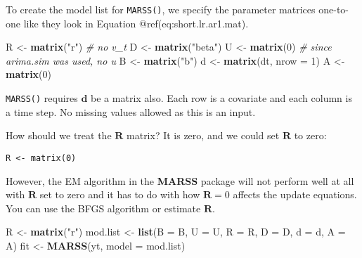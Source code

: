 \documentclass[12pt,]{book}
\newenvironment{Shaded}{\begin{snugshade}}{\end{snugshade}}
\newcommand{\CommentTok}[1]{\textcolor[rgb]{0.56,0.35,0.01}{\textit{#1}}}
\newcommand{\DataTypeTok}[1]{\textcolor[rgb]{0.13,0.29,0.53}{#1}}
\newcommand{\DecValTok}[1]{\textcolor[rgb]{0.00,0.00,0.81}{#1}}
\newcommand{\KeywordTok}[1]{\textcolor[rgb]{0.13,0.29,0.53}{\textbf{#1}}}
\newcommand{\NormalTok}[1]{#1}
\newcommand{\StringTok}[1]{\textcolor[rgb]{0.31,0.60,0.02}{#1}}
\begin{document}
To create the model list for \texttt{MARSS()}, we specify the parameter matrices one-to-one like they look in Equation @ref(eq:short.lr.ar1.mat).

\begin{Shaded}
\begin{Highlighting}[]
\NormalTok{R <-}\StringTok{ }\KeywordTok{matrix}\NormalTok{(}\StringTok{"r"}\NormalTok{)  }\CommentTok{# no v_t}
\NormalTok{D <-}\StringTok{ }\KeywordTok{matrix}\NormalTok{(}\StringTok{"beta"}\NormalTok{)}
\NormalTok{U <-}\StringTok{ }\KeywordTok{matrix}\NormalTok{(}\DecValTok{0}\NormalTok{)  }\CommentTok{# since arima.sim was used, no u}
\NormalTok{B <-}\StringTok{ }\KeywordTok{matrix}\NormalTok{(}\StringTok{"b"}\NormalTok{)}
\NormalTok{d <-}\StringTok{ }\KeywordTok{matrix}\NormalTok{(dt, }\DataTypeTok{nrow =} \DecValTok{1}\NormalTok{)}
\NormalTok{A <-}\StringTok{ }\KeywordTok{matrix}\NormalTok{(}\DecValTok{0}\NormalTok{)}
\end{Highlighting}
\end{Shaded}

\texttt{MARSS()} requires \(\mathbf{d}\) be a matrix also. Each row is a covariate and each column is a time step. No missing values allowed as this is an input.

How should we treat the \(\mathbf{R}\) matrix? It is zero, and we could set \(\mathbf{R}\) to zero:

\begin{verbatim}
R <- matrix(0)
\end{verbatim}

However, the EM algorithm in the \textbf{MARSS} package will not perform well at all with \(\mathbf{R}\) set to zero and it has to do with how \(\mathbf{R}=0\) affects the update equations. You can use the BFGS algorithm or estimate \(\mathbf{R}\).

\begin{Shaded}
\begin{Highlighting}[]
\NormalTok{R <-}\StringTok{ }\KeywordTok{matrix}\NormalTok{(}\StringTok{"r"}\NormalTok{)}
\NormalTok{mod.list <-}\StringTok{ }\KeywordTok{list}\NormalTok{(}\DataTypeTok{B =}\NormalTok{ B, }\DataTypeTok{U =}\NormalTok{ U, }\DataTypeTok{R =}\NormalTok{ R, }\DataTypeTok{D =}\NormalTok{ D, }\DataTypeTok{d =}\NormalTok{ d, }\DataTypeTok{A =}\NormalTok{ A)}
\NormalTok{fit <-}\StringTok{ }\KeywordTok{MARSS}\NormalTok{(yt, }\DataTypeTok{model =}\NormalTok{ mod.list)}
\end{Highlighting}
\end{Shaded}
\end{document}
